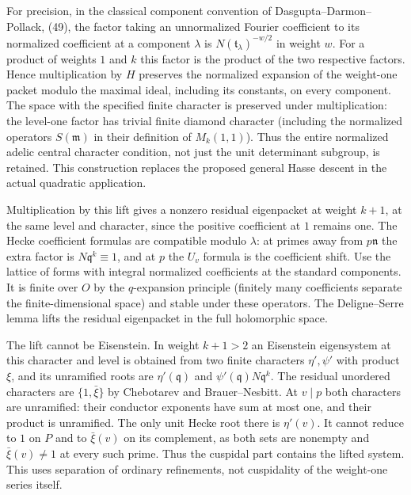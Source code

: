 For precision, in the classical component convention of
Dasgupta--Darmon--Pollack, (49), the factor taking an unnormalized
Fourier coefficient to its normalized coefficient at a component
\(\lambda\) is \(N(\mathfrak t_\lambda)^{-w/2}\) in weight \(w\).
For a product of weights \(1\) and \(k\) this factor is the
product of the two respective factors. Hence multiplication by
\(H\) preserves the normalized expansion of the weight-one packet
modulo the maximal ideal, including its constants, on every
component. The space with the specified finite character is
preserved under multiplication: the level-one factor has trivial
finite diamond character (including the normalized operators
\(S(\mathfrak m)\) in their definition of \(M_k(1,1)\)).
Thus the entire normalized adelic central character condition,
not just the unit determinant subgroup, is retained.
This construction replaces the proposed general Hasse descent
in the actual quadratic application.

Multiplication by this lift gives a nonzero residual eigenpacket
at weight \(k+1\), at the same level and character, since the
positive coefficient at \(1\) remains one. The Hecke coefficient
formulas are compatible modulo \(\lambda\): at primes away from
\(p\mathfrak n\) the extra factor is \(N\mathfrak q^k\equiv1\),
and at \(p\) the \(U_v\) formula is the coefficient shift.
Use the lattice of forms with integral normalized coefficients
at the standard components. It is finite over \(O\) by the
\(q\)-expansion principle (finitely many coefficients separate
the finite-dimensional space) and stable under these operators.
The Deligne--Serre lemma lifts the residual eigenpacket in the
full holomorphic space.

The lift cannot be Eisenstein. In weight \(k+1>2\) an Eisenstein
eigensystem at this character and level is obtained from two
finite characters \(\eta',\psi'\) with product \(\xi\), and its
unramified roots are \(\eta'(\mathfrak q)\) and
\(\psi'(\mathfrak q)N\mathfrak q^k\). The residual unordered
characters are \(\{1,\bar\xi\}\) by Chebotarev and
Brauer--Nesbitt. At \(v\mid p\) both characters are unramified:
their conductor exponents have sum at most one, and their
product is unramified. The only unit Hecke root there is
\(\eta'(v)\). It cannot reduce to \(1\) on \(P\) and to
\(\bar\xi(v)\) on its complement, as both sets are nonempty and
\(\bar\xi(v)\ne1\) at every such prime. Thus the cuspidal part
contains the lifted system. This uses separation of ordinary
refinements, not cuspidality of the weight-one series itself.


